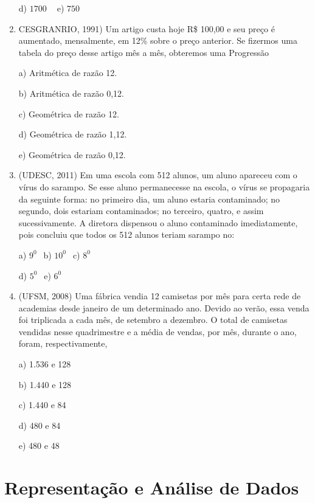 \begin{multicols*}{2}
\begin{enumerate}
              d) $1700 \ \ \ \ $ e) $750 $

        \item CESGRANRIO, 1991) Um artigo custa hoje R\$ 100,00 e seu preço é aumentado, mensalmente, em 12\% sobre o preço anterior. Se fizermos uma tabela do preço desse artigo mês a mês, obteremos uma Progressão

              a) Aritmética de razão 12.

              b) Aritmética de razão 0,12.

              c) Geométrica de razão 12.

              d) Geométrica de razão 1,12.

              e) Geométrica de razão 0,12.

        \item (UDESC, 2011) Em uma escola com 512 alunos, um aluno apareceu com o vírus do sarampo. Se esse aluno permanecesse na escola, o vírus se propagaria da seguinte forma: no primeiro dia, um aluno estaria contaminado; no segundo, dois estariam contaminados; no terceiro, quatro, e assim sucessivamente. A diretora dispensou o aluno contaminado imediatamente, pois concluiu que todos os 512 alunos teriam sarampo no:

              a) $9^0 \ \ $ b) $10^0 \ \ $ c) $8^0 \ \ $

              d) $5^0 \ \ $ e) $6^0 $

        \item (UFSM, 2008) Uma fábrica vendia 12 camisetas por mês para certa rede de academias desde janeiro de um determinado ano. Devido ao verão, essa venda foi triplicada a cada mês, de setembro a dezembro. O total de camisetas vendidas nesse quadrimestre e a média de vendas, por mês, durante o ano, foram, respectivamente,

              a) 1.536 e 128

              b) 1.440 e 128

              c) 1.440 e 84

              d) 480 e 84

              e) 480 e 48



    \end{enumerate}



    \section*{Representação e Análise de Dados}


\end{multicols*}

